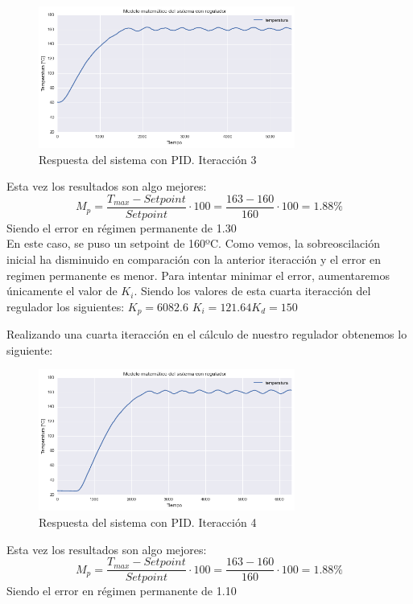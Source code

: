     \begin{figure}[H]
            \centering
            \includegraphics[width=0.75\textwidth]{images/PLC/modelado/modelado_34_1.png}
            \caption{Respuesta del sistema con PID. Iteracción 3}
            \label{fig:plc_PID3}
    \end{figure}
Esta vez los resultados son algo mejores:
$$M_{p}=\frac{T_{max}-Setpoint}{Setpoint} \cdot 100 = \frac{163-160}{160} \cdot 100 = 1.88\%$$ 
Siendo el error en régimen permanente de 1.30\\
En este caso, se puso un setpoint de 160ºC. Como vemos, la sobreoscilación inicial ha disminuido en comparación con la anterior iteracción y el error en regimen permanente es menor. Para intentar minimar el error, aumentaremos únicamente el valor de $K_i$. Siendo los valores de esta cuarta iteracción del regulador los siguientes:
    $K_p = 6082.6$ $K_i=121.64 K_d=150$

Realizando una cuarta iteracción en el cálculo de nuestro regulador obtenemos lo siguiente:

    \begin{figure}[H]
            \centering
            \includegraphics[width=0.75\textwidth]{images/PLC/modelado/modelado_38_1.png}
            \caption{Respuesta del sistema con PID. Iteracción 4}
            \label{fig:plc_PID4}
    \end{figure}
Esta vez los resultados son algo mejores:
$$M_{p}=\frac{T_{max}-Setpoint}{Setpoint} \cdot 100 = \frac{163-160}{160} \cdot 100 = 1.88\%$$ 
Siendo el error en régimen permanente de 1.10\\

